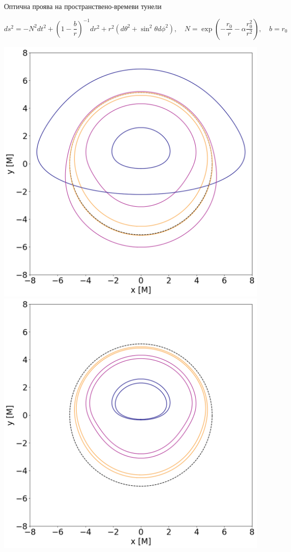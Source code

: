 \documentclass[hyperref={colorlinks,citecolor=blue,linkcolor=blue,urlcolor=blue}]{beamer}
\begin{document}
	\begin{frame}{Оптична проява на пространствено-времеви тунели}
		
		\tiny
		\begin{equation*}
			ds^2 = - N^2dt^2 + \left(1- \frac{b}{r}\right)^{-1}dr^2 + r^2\left(d\theta^2 + \sin^2\theta d\phi^2\right), \quad N = \exp\left(-\frac{r_0}{r} -\alpha \frac{r_0^2}{r^2}\right),\quad b = r_0
		\end{equation*}
		
		\centering
		\includegraphics[scale = 0.2]{Section_6_Morphology_of_the images_of_horizonless_spacetimes/WH_70_deg_r6_gamma_2.png}
		\includegraphics[scale = 0.23]{Section_6_Morphology_of_the images_of_horizonless_spacetimes/WH_70_deg_r6_r500.png}
				

\end{frame}
\end{document}
